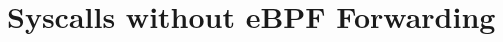 
{\let\clearpage\relax \chapter{Syscalls without eBPF Forwarding}\label{chap:appendix-plain-relay}}
